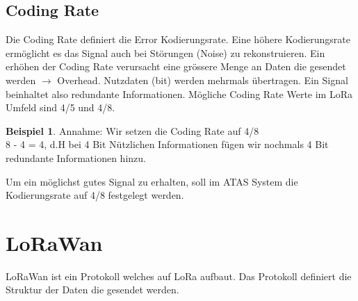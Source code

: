 \documentclass[11pt,english,german]{report}
\theoremstyle{definition}
\newtheorem{exmp}{Beispiel}[subsection]
\begin{document}
\newpage
\subsection{Coding Rate}
Die Coding Rate definiert die Error Kodierungsrate. Eine höhere Kodierungsrate ermöglicht es das Signal auch bei Störungen (Noise) zu rekonstruieren. Ein erhöhen der Coding Rate verursacht eine grössere Menge an Daten die gesendet werden $\rightarrow$ Overhead. Nutzdaten (bit) werden mehrmals übertragen. Ein Signal beinhaltet also redundante Informationen. Mögliche Coding Rate Werte im LoRa Umfeld sind 4/5 und 4/8.
\begin{exmp}
	Annahme: Wir setzen die Coding Rate auf 4/8\\
	8 - 4 = 4, d.H bei 4 Bit Nützlichen Informationen fügen wir nochmals 4 Bit redundante Informationen hinzu.
\end{exmp}
\noindent
Um ein möglichst gutes Signal zu erhalten, soll im ATAS System die Kodierungsrate auf 4/8 festgelegt werden.

\newpage
\section{LoRaWan}
LoRaWan ist ein Protokoll welches auf LoRa aufbaut. Das Protokoll definiert die Struktur der Daten die gesendet werden.
\end{document}
